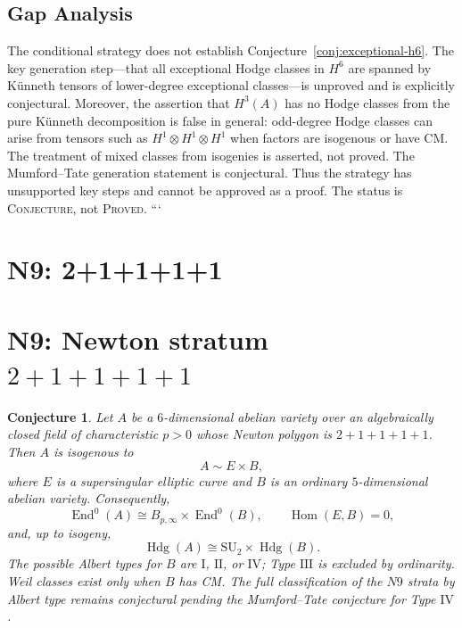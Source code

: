 \documentclass{article}
\newtheorem{conjecture}{Conjecture}
\begin{document}
\subsection{Gap Analysis}
\label{subsec:gap-analysis}

The conditional strategy does not establish Conjecture~\ref{conj:exceptional-h6}. The key generation step---that all exceptional Hodge classes in $H^6$ are spanned by K\"unneth tensors of lower-degree exceptional classes---is unproved and is explicitly conjectural. Moreover, the assertion that $H^3(A)$ has no Hodge classes from the pure K\"unneth decomposition is false in general: odd-degree Hodge classes can arise from tensors such as $H^1 \otimes H^1 \otimes H^1$ when factors are isogenous or have CM. The treatment of mixed classes from isogenies is asserted, not proved. The Mumford--Tate generation statement is conjectural. Thus the strategy has unsupported key steps and cannot be approved as a proof. The status is \textsc{Conjecture}, not \textsc{Proved}.
```

\section{N9: 2+1+1+1+1}
\section*{N9: Newton stratum \(2+1+1+1+1\)}

\begin{conjecture}
Let \(A\) be a \(6\)-dimensional abelian variety over an algebraically closed field of characteristic \(p>0\) whose Newton polygon is \(2+1+1+1+1\). Then \(A\) is isogenous to
\[
A \sim E \times B,
\]
where \(E\) is a supersingular elliptic curve and \(B\) is an ordinary \(5\)-dimensional abelian variety. Consequently,
\[
\operatorname{End}^0(A) \cong B_{p,\infty} \times \operatorname{End}^0(B),
\qquad
\operatorname{Hom}(E,B)=0,
\]
and, up to isogeny,
\[
\operatorname{Hdg}(A) \cong \mathrm{SU}_2 \times \operatorname{Hdg}(B).
\]
The possible Albert types for \(B\) are \(\mathrm{I}\), \(\mathrm{II}\), or \(\mathrm{IV}\); Type \(\mathrm{III}\) is excluded by ordinarity. Weil classes exist only when \(B\) has CM. The full classification of the \(N9\) strata by Albert type remains conjectural pending the Mumford--Tate conjecture for Type \(\mathrm{IV}\).
\end{conjecture}
\end{document}
